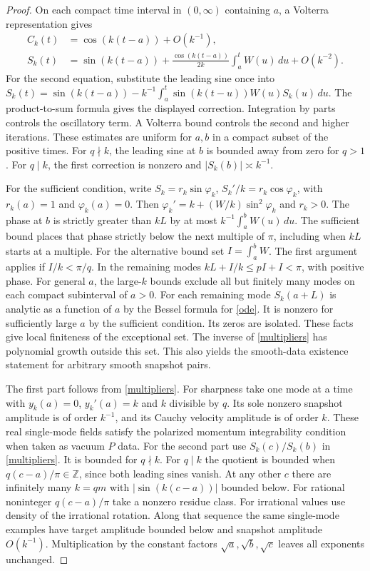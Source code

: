 \documentclass[11pt]{article}
\newcommand{\Z}{\mathbb Z}
\begin{document}
\begin{proof}
On each compact time interval in $(0,\infty)$ containing $a$, a
Volterra representation gives
\begin{align}
 C_k(t)&=\cos(k(t-a))+O(k^{-1}),\\
 S_k(t)&=\sin(k(t-a))
       +\frac{\cos(k(t-a))}{2k}\int_a^t W(u)\,du+O(k^{-2}).
 \label{phase}
\end{align}
For the second equation, substitute the leading sine once into
$S_k(t)=\sin(k(t-a))-k^{-1}\int_a^t \sin(k(t-u))W(u)S_k(u)\,du$.
The product-to-sum formula gives the displayed correction. Integration
by parts controls the oscillatory term. A Volterra bound controls the
second and higher iterations. These estimates are uniform for $a,b$ in
a compact subset of the positive times. For $q\nmid k$, the leading
sine at $b$ is bounded away from zero for $q>1$. For $q\mid k$, the
first correction is nonzero and $|S_k(b)|\asymp k^{-1}$.

For the sufficient condition, write
$S_k=r_k\sin\varphi_k$,
$S_k'/k=r_k\cos\varphi_k$, with $r_k(a)=1$ and $\varphi_k(a)=0$.
Then $\varphi_k'=k+(W/k)\sin^2\varphi_k$ and $r_k>0$.
The phase at $b$ is strictly greater than $kL$ by at most
$k^{-1}\int_a^b W(u)\,du$. The sufficient bound places that phase
strictly below the next multiple of $\pi$, including when $kL$
starts at a multiple. For the alternative bound set $I=\int_a^b W$.
The first argument applies if $I/k<\pi/q$. In the remaining modes
$kL+I/k\le pI+I<\pi$, with positive phase. For general $a$, the large-$k$ bounds exclude
all but finitely many modes on each compact subinterval of $a>0$.
For each remaining mode $S_k(a+L)$ is analytic as a function of $a$
by the Bessel formula for \eqref{ode}. It is nonzero for sufficiently
large $a$ by the sufficient condition. Its zeros are isolated. These
facts give local finiteness of the exceptional set. The inverse
of \eqref{multipliers} has polynomial growth outside this set.
This also yields the smooth-data existence statement for arbitrary
smooth snapshot pairs.

The first part follows from \eqref{multipliers}. For sharpness take
one mode at a time with $y_k(a)=0$, $y_k'(a)=k$ and $k$ divisible by
$q$. Its sole nonzero snapshot amplitude is of order $k^{-1}$,
and its Cauchy velocity amplitude is of order $k$.
These real single-mode fields satisfy the polarized momentum
integrability condition when taken as vacuum $P$ data.
For the second part use $S_k(c)/S_k(b)$ in \eqref{multipliers}.
It is bounded for $q\nmid k$. For $q\mid k$ the quotient is
bounded when $q(c-a)/\pi\in\Z$, since both leading sines vanish.
At any other $c$ there are infinitely many $k=qm$ with
$|\sin(k(c-a))|$ bounded below. For rational noninteger
$q(c-a)/\pi$ take a nonzero residue class. For irrational values use
density of the irrational rotation. Along that sequence the same
single-mode examples have target amplitude bounded below and
snapshot amplitude $O(k^{-1})$. Multiplication by the constant
factors $\sqrt a,\sqrt b,\sqrt c$ leaves all exponents unchanged.


\end{proof}
\end{document}
